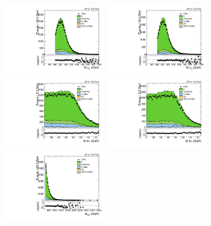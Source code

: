 \begin{figure}[htbp]
  \centering
  \includegraphics[width=0.3825\textwidth]{fig/controlPlots/CR_b1_mu_allP_allC_allD_Run2_lnujj_l1_pt.pdf}
  \includegraphics[width=0.3825\textwidth]{fig/controlPlots/CR_b1_e_allP_allC_allD_Run2_lnujj_l1_pt.pdf}\\
  \includegraphics[width=0.3825\textwidth]{fig/controlPlots/CR_b1_mu_allP_allC_allD_Run2_lnujj_l1_mt.pdf}
  \includegraphics[width=0.3825\textwidth]{fig/controlPlots/CR_b1_e_allP_allC_allD_Run2_lnujj_l1_mt.pdf}\\
  \includegraphics[width=0.3825\textwidth]{fig/controlPlots/CR_b1_mu_allP_allC_allD_Run2_mWV.pdf}

\end{figure}
